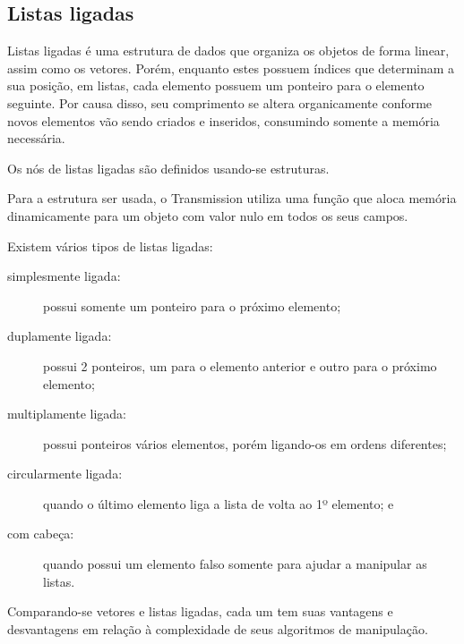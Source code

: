 
\newpage
\subsection*{Listas ligadas}

Listas ligadas é uma estrutura de dados que organiza os objetos de forma linear, assim
como os vetores. Porém, enquanto estes possuem índices que determinam a sua posição, em
listas, cada elemento possuem um ponteiro para o elemento seguinte. Por causa disso,
seu comprimento se altera organicamente conforme novos elementos vão sendo criados e
inseridos, consumindo somente a memória necessária.

Os nós de listas ligadas são definidos usando-se estruturas.


Para a estrutura ser usada, o Transmission utiliza uma função que aloca memória
dinamicamente para um objeto com valor nulo em todos os seus campos.


Existem vários tipos de listas ligadas:

\begin{description}
    \item[simplesmente ligada:] possui somente um ponteiro para o próximo elemento;
    \item[duplamente ligada:] possui 2 ponteiros, um para o elemento anterior e outro
        para o próximo elemento;
    \item[multiplamente ligada:] possui ponteiros vários elementos, porém ligando-os em
        ordens diferentes;
    \item[circularmente ligada:] quando o último elemento liga a lista de volta ao
        1º elemento; e
    \item[com cabeça:] quando possui um elemento falso somente para ajudar a manipular
        as listas.
\end{description}

Comparando-se vetores e listas ligadas, cada um tem suas vantagens e desvantagens em
relação à complexidade de seus algoritmos de manipulação.

